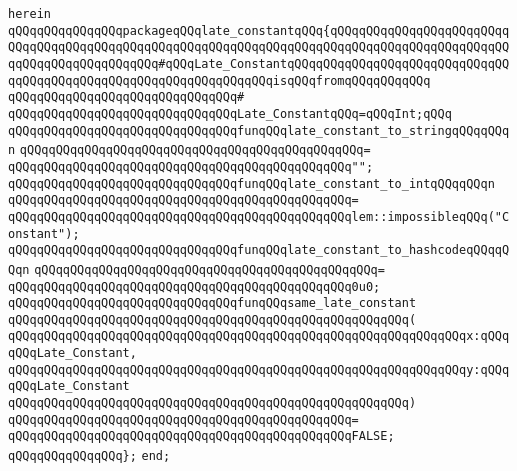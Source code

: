 \verb|herein|\newline
\newline
\verb|qQQqqQQqqQQqqQQqpackageqQQqlate_constantqQQq{qQQqqQQqqQQqqQQqqQQqqQQqqQQqqQQqqQQqqQQqqQQqqQQqqQQqqQQqqQQqqQQqqQQqqQQqqQQqqQQqqQQqqQQqqQQqqQQqqQQqqQQqqQQqqQQqqQQq#qQQqLate_ConstantqQQqqQQqqQQqqQQqqQQqqQQqqQQqqQQqqQQqqQQqqQQqqQQqqQQqqQQqqQQqqQQqqQQqisqQQqfromqQQqqQQqqQQq|\newline
\verb|qQQqqQQqqQQqqQQqqQQqqQQqqQQqqQQq#|\newline
\verb|qQQqqQQqqQQqqQQqqQQqqQQqqQQqqQQqLate_ConstantqQQq=qQQqInt;qQQq|\newline
\newline
\verb|qQQqqQQqqQQqqQQqqQQqqQQqqQQqqQQqfunqQQqlate_constant_to_stringqQQqqQQqn|\newline
\verb|qQQqqQQqqQQqqQQqqQQqqQQqqQQqqQQqqQQqqQQqqQQqqQQq=|\newline
\verb|qQQqqQQqqQQqqQQqqQQqqQQqqQQqqQQqqQQqqQQqqQQqqQQq"";|\newline
\newline
\newline
\verb|qQQqqQQqqQQqqQQqqQQqqQQqqQQqqQQqfunqQQqlate_constant_to_intqQQqqQQqn|\newline
\verb|qQQqqQQqqQQqqQQqqQQqqQQqqQQqqQQqqQQqqQQqqQQqqQQq=|\newline
\verb|qQQqqQQqqQQqqQQqqQQqqQQqqQQqqQQqqQQqqQQqqQQqqQQqlem::impossibleqQQq("Constant");|\newline
\newline
\newline
\verb|qQQqqQQqqQQqqQQqqQQqqQQqqQQqqQQqfunqQQqlate_constant_to_hashcodeqQQqqQQqn|\newline
\verb|qQQqqQQqqQQqqQQqqQQqqQQqqQQqqQQqqQQqqQQqqQQqqQQq=|\newline
\verb|qQQqqQQqqQQqqQQqqQQqqQQqqQQqqQQqqQQqqQQqqQQqqQQq0u0;|\newline
\newline
\verb|qQQqqQQqqQQqqQQqqQQqqQQqqQQqqQQqfunqQQqsame_late_constant|\newline
\verb|qQQqqQQqqQQqqQQqqQQqqQQqqQQqqQQqqQQqqQQqqQQqqQQqqQQqqQQq(|\newline
\verb|qQQqqQQqqQQqqQQqqQQqqQQqqQQqqQQqqQQqqQQqqQQqqQQqqQQqqQQqqQQqqQQqx:qQQqqQQqLate_Constant,|\newline
\verb|qQQqqQQqqQQqqQQqqQQqqQQqqQQqqQQqqQQqqQQqqQQqqQQqqQQqqQQqqQQqqQQqy:qQQqqQQqLate_Constant|\newline
\verb|qQQqqQQqqQQqqQQqqQQqqQQqqQQqqQQqqQQqqQQqqQQqqQQqqQQqqQQq)|\newline
\verb|qQQqqQQqqQQqqQQqqQQqqQQqqQQqqQQqqQQqqQQqqQQqqQQq=|\newline
\verb|qQQqqQQqqQQqqQQqqQQqqQQqqQQqqQQqqQQqqQQqqQQqqQQqFALSE;|\newline
\verb|qQQqqQQqqQQqqQQq};|\newline
\verb|end;|\newline

